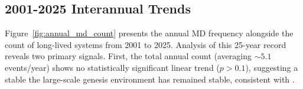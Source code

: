%
%
\subsection{2001-2025 Interannual Trends}
\label{subsec:interannual}

Figure~\ref{fig:annual_md_count} presents the annual MD frequency
alongside the count of long-lived systems from 2001 to 2025. Analysis
of this 25-year record reveals two primary signals. First, the total
annual count (averaging $\sim 5.1$ events/year) shows no
statistically significant linear trend ($p > 0.1$), suggesting a
stable the large-scale genesis environment has remained stable,
consistent with \autocite{mishra2021monsoon}.


